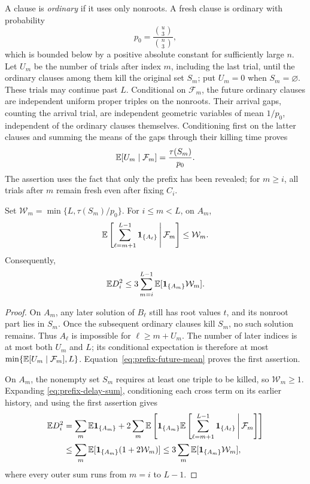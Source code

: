 A clause is \emph{ordinary} if it uses only nonroots.  A fresh clause
is ordinary with probability
\[
 p_0=\frac{\binom{u}{3}}{\binom n3},
\]
which is bounded below by a positive absolute constant for sufficiently
large \(n\).  Let \(U_m\) be the number of trials after index \(m\),
including the last trial, until the ordinary clauses among them kill
the original set \(S_m\); put \(U_m=0\) when \(S_m=\varnothing\).
These trials may continue past \(L\).  Conditional on \(\mathcal F_m\),
the future ordinary clauses are independent uniform proper triples on
the nonroots.  Their arrival gaps, counting the arrival trial, are
independent geometric variables of mean \(1/p_0\), independent of the
ordinary clauses themselves.  Conditioning first on the latter clauses
and summing the means of the gaps through their killing time proves
\begin{equation}\label{eq:prefix-future-mean}
 \mathbb E[U_m\mid\mathcal F_m]=\frac{\tau(S_m)}{p_0}.
\end{equation}
The assertion uses the fact that only the prefix has been revealed;
for \(m\ge i\), all trials after \(m\) remain fresh even after fixing
\(C_i\).

\begin{lemma}\label{lem:prefix-future-delay}
Set \(\mathcal W_m=\min\{L,\tau(S_m)/p_0\}\).  For \(i\le m<L\),
on \(A_m\),
\[
 \mathbb E\left[\sum_{\ell=m+1}^{L-1}\mathbf 1_{\{A_\ell\}}
                  \,\middle|\,\mathcal F_m\right]\le\mathcal W_m.
\]
Consequently,
\begin{equation}\label{eq:prefix-weighted-delay}
 \mathbb E D_i^2\le3\sum_{m=i}^{L-1}\mathbb E[\mathbf 1_{\{A_m\}}\mathcal W_m].
\end{equation}
\end{lemma}

\begin{proof}
On \(A_m\), any later solution of \(B_\ell\) still has root values
\(t\), and its nonroot part lies in \(S_m\).  Once the subsequent
ordinary clauses kill \(S_m\), no such solution remains.  Thus
\(A_\ell\) is impossible for \(\ell\ge m+U_m\).  The number of later
indices is at most both \(U_m\) and \(L\); its conditional expectation
is therefore at most \(\min\{\mathbb E[U_m\mid\mathcal F_m],L\}\).
Equation~\eqref{eq:prefix-future-mean} proves the first assertion.

On \(A_m\), the nonempty set \(S_m\) requires at least one triple to
be killed, so \(\mathcal W_m\ge1\).  Expanding
\eqref{eq:prefix-delay-sum}, conditioning each cross term on its earlier
history, and using the first assertion gives
\begin{align*}
 \mathbb E D_i^2
 &=\sum_m\mathbb E\mathbf 1_{\{A_m\}}
   +2\sum_m\mathbb E\left[\mathbf 1_{\{A_m\}}
      \mathbb E\left[\sum_{\ell=m+1}^{L-1}\mathbf 1_{\{A_\ell\}}
                  \,\middle|\,\mathcal F_m\right]\right]\\
 &\le\sum_m\mathbb E[\mathbf 1_{\{A_m\}}(1+2\mathcal W_m)]
 \le3\sum_m\mathbb E[\mathbf 1_{\{A_m\}}\mathcal W_m],
\end{align*}
where every outer sum runs from \(m=i\) to \(L-1\).
\end{proof}


